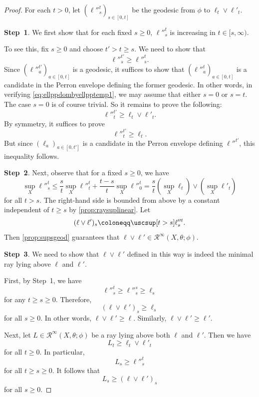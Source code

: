 \begin{proof}
    For each $t>0$, let $(\ell''^t_{s})_{s\in [0,t]}$ be the geodesic from $\phi$ to $\ell_t\lor \ell'_t$.

    \textbf{Step~1}.
    We first show that for each fixed $s\geq 0$, $\ell''^t_{s}$ is increasing in $t\in [s,\infty)$.

    To see this, fix $s\geq 0$ and choose $t'>t\geq s$. We need to show that
    \begin{equation}\label{eq:ellppdombyellpptemp1}
    \ell''^{t'}_s\geq \ell''^{t}_s.
    \end{equation}
    Since $(\ell''^{t'}_a)_{a\in [0,t]}$ is a geodesic, it suffices to show that $(\ell''^t_a)_{a\in [0,t]}$ is a candidate in the Perron envelope defining the former geodesic.
    In other words, in verifying \eqref{eq:ellppdombyellpptemp1}, we may assume that either $s=0$ or $s=t$. The case $s=0$ is of course trivial. So it remains to prove the following:
    \[
    \ell''^{t'}_t\geq \ell_t\lor \ell'_t.
    \]
    By symmetry, it suffices to prove
    \[
    \ell''^{t'}_t\geq \ell_t.
    \]
    But since $(\ell_a)_{a\in [0,t']}$ is a candidate in the Perron envelope defining $\ell''^{t'}$, this inequality follows.

    \textbf{Step~2}.
    Next, observe that for a fixed $s\geq 0$, we have
    \[
    \sup_X \ell''^t_s\leq \frac{s}{t}\sup_X\ell''^t_t+ \frac{t-s}{t}\sup_X \ell''^t_0=\frac{s}{t}\left( \sup_X\ell_t \right)\lor \left( \sup_X\ell'_t \right)
    \]
    for all $t>s$. The right-hand side is bounded from above by a constant independent of $t\geq s$ by \cref{prop:raysuplinear}.
    Let
    \begin{equation}\label{eq:llorlp}
    (\ell\lor \ell')_s\coloneqq \uscsup[t>s] \ell''^t_{s}.
    \end{equation}
    Then \cref{prop:supsgeod} guarantees that $\ell\lor \ell'\in \mathcal{R}^{\infty}(X,\theta;\phi)$.

    \textbf{Step~3}.
    We need to show that $\ell\lor \ell'$ defined in this way is indeed the minimal ray lying above $\ell$ and $\ell'$.

    First, by Step~1, we have
    \[
    \ell''^t_s\geq \ell''^s_s\geq \ell_s
    \]
    for any $t\geq s\geq 0$. Therefore,
    \[
    (\ell\lor \ell')_s\geq \ell_s
    \]
    for all $s\geq 0$. In other words, $\ell\lor \ell'\geq \ell$.
    Similarly, $\ell\lor \ell'\geq \ell'$.

    Next, let $L\in \mathcal{R}^{\infty}(X,\theta;\phi)$ be a ray lying above both $\ell$ and $\ell'$. Then we have
    \[
    L_t\geq \ell_t\lor \ell'_t
    \]
    for all $t\geq 0$. In particular,
    \[
    L_s\geq \ell''^t_s
    \]
    for all $t\geq s\geq 0$. It follows that
    \[
    L_s\geq (\ell\lor \ell')_s
    \]
    for all $s\geq 0$.


\end{proof}

